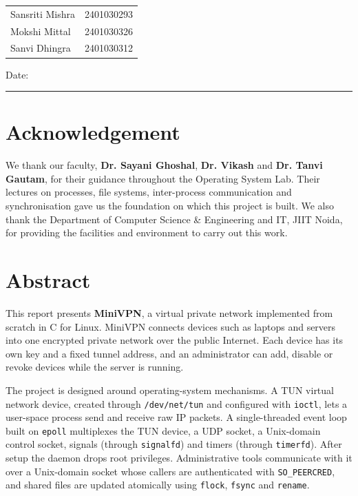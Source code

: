 \documentclass[12pt,a4paper]{report}
\begin{document}
\vspace{2cm}
\noindent
\begin{tabular}{@{}ll@{}}
Sansriti Mishra & 2401030293\\[4pt]
Mokshi Mittal & 2401030326\\[4pt]
Sanvi Dhingra & 2401030312
\end{tabular}

\vspace{1cm}
\noindent Date: \rule{4cm}{0.4pt}

\chapter*{Acknowledgement}
We thank our faculty, \textbf{Dr. Sayani Ghoshal}, \textbf{Dr. Vikash} and
\textbf{Dr. Tanvi Gautam}, for their guidance throughout the Operating System Lab.
Their lectures on processes, file systems, inter-process communication and
synchronisation gave us the foundation on which this project is built. We also thank
the Department of Computer Science \& Engineering and IT, JIIT Noida, for providing
the facilities and environment to carry out this work.

\chapter*{Abstract}
This report presents \textbf{MiniVPN}, a virtual private network implemented from
scratch in C for Linux. MiniVPN connects devices such as laptops and servers into one
encrypted private network over the public Internet. Each device has its own key and a
fixed tunnel address, and an administrator can add, disable or revoke devices while
the server is running.

The project is designed around operating-system mechanisms. A TUN virtual network
device, created through \texttt{/dev/net/tun} and configured with \texttt{ioctl}, lets
a user-space process send and receive raw IP packets. A single-threaded event loop
built on \texttt{epoll} multiplexes the TUN device, a UDP socket, a Unix-domain
control socket, signals (through \texttt{signalfd}) and timers (through
\texttt{timerfd}). After setup the daemon drops root privileges. Administrative
tools communicate with it over a Unix-domain socket whose callers are authenticated
with \texttt{SO\_PEERCRED}, and shared files are updated atomically using
\texttt{flock}, \texttt{fsync} and \texttt{rename}.
\end{document}
